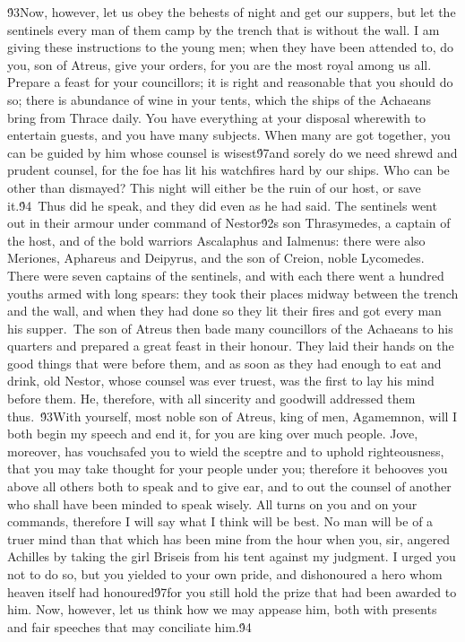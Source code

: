 {\'93Now, however, let us obey the behests of night and get our suppers, but let the sentinels every man of them camp by the trench that is without the wall. I am giving these instructions to the young men; when they have been attended to, do you, son of Atreus, give your orders, for you are the most royal among us all. Prepare a feast for your councillors; it is right and reasonable that you should do so; there is abundance of wine in your tents, which the ships of the Achaeans bring from Thrace daily. You have everything at your disposal wherewith to entertain guests, and you have many subjects. When many are got together, you can be guided by him whose counsel is wisest\'97and sorely do we need shrewd and prudent counsel, for the foe has lit his watchfires hard by our ships. Who can be other than dismayed? This night will either be the ruin of our host, or save it.\'94\
Thus did he speak, and they did even as he had said. The sentinels went out in their armour under command of Nestor\'92s son Thrasymedes, a captain of the host, and of the bold warriors Ascalaphus and Ialmenus: there were also Meriones, Aphareus and Deipyrus, and the son of Creion, noble Lycomedes. There were seven captains of the sentinels, and with each there went a hundred youths armed with long spears: they took their places midway between the trench and the wall, and when they had done so they lit their fires and got every man his supper.\
The son of Atreus then bade many councillors of the Achaeans to his quarters and prepared a great feast in their honour. They laid their hands on the good things that were before them, and as soon as they had enough to eat and drink, old Nestor, whose counsel was ever truest, was the first to lay his mind before them. He, therefore, with all sincerity and goodwill addressed them thus.\
\'93With yourself, most noble son of Atreus, king of men, Agamemnon, will I both begin my speech and end it, for you are king over much people. Jove, moreover, has vouchsafed you to wield the sceptre and to uphold righteousness, that you may take thought for your people under you; therefore it behooves you above all others both to speak and to give ear, and to out the counsel of another who shall have been minded to speak wisely. All turns on you and on your commands, therefore I will say what I think will be best. No man will be of a truer mind than that which has been mine from the hour when you, sir, angered Achilles by taking the girl Briseis from his tent against my judgment. I urged you not to do so, but you yielded to your own pride, and dishonoured a hero whom heaven itself had honoured\'97for you still hold the prize that had been awarded to him. Now, however, let us think how we may appease him, both with presents and fair speeches that may conciliate him.\'94\
}
